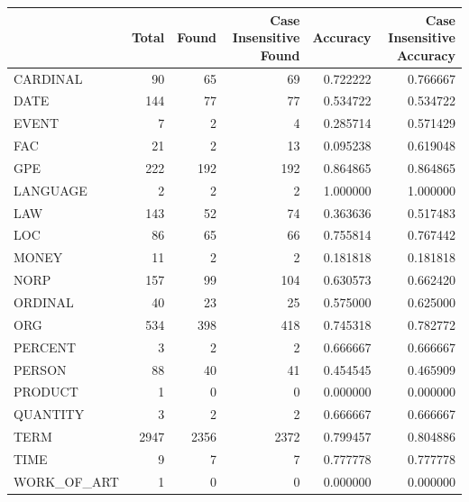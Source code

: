 \begin{tabular}{lrrrrr}
\toprule
 & Total & Found & Case Insensitive Found & Accuracy & Case Insensitive Accuracy \\
\midrule
CARDINAL & 90 & 65 & 69 & 0.722222 & 0.766667 \\
DATE & 144 & 77 & 77 & 0.534722 & 0.534722 \\
EVENT & 7 & 2 & 4 & 0.285714 & 0.571429 \\
FAC & 21 & 2 & 13 & 0.095238 & 0.619048 \\
GPE & 222 & 192 & 192 & 0.864865 & 0.864865 \\
LANGUAGE & 2 & 2 & 2 & 1.000000 & 1.000000 \\
LAW & 143 & 52 & 74 & 0.363636 & 0.517483 \\
LOC & 86 & 65 & 66 & 0.755814 & 0.767442 \\
MONEY & 11 & 2 & 2 & 0.181818 & 0.181818 \\
NORP & 157 & 99 & 104 & 0.630573 & 0.662420 \\
ORDINAL & 40 & 23 & 25 & 0.575000 & 0.625000 \\
ORG & 534 & 398 & 418 & 0.745318 & 0.782772 \\
PERCENT & 3 & 2 & 2 & 0.666667 & 0.666667 \\
PERSON & 88 & 40 & 41 & 0.454545 & 0.465909 \\
PRODUCT & 1 & 0 & 0 & 0.000000 & 0.000000 \\
QUANTITY & 3 & 2 & 2 & 0.666667 & 0.666667 \\
TERM & 2947 & 2356 & 2372 & 0.799457 & 0.804886 \\
TIME & 9 & 7 & 7 & 0.777778 & 0.777778 \\
WORK_OF_ART & 1 & 0 & 0 & 0.000000 & 0.000000 \\
\bottomrule
\end{tabular}
